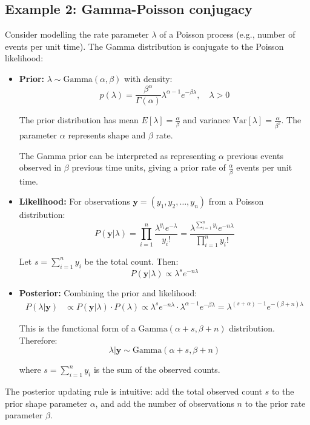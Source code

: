 \subsection{Example 2: Gamma-Poisson conjugacy}
\begin{examplebox}
\begin{example}
Consider modelling the rate parameter $\lambda$ of a Poisson process (e.g., number of events per unit time). The Gamma distribution is conjugate to the Poisson likelihood:
\begin{itemize}
\item \textbf{Prior:} $\lambda \sim \text{Gamma}(\alpha, \beta)$ with density:
$$p(\lambda) = \frac{\beta^\alpha}{\Gamma(\alpha)} \lambda^{\alpha-1} e^{-\beta\lambda}, \quad \lambda > 0$$

The prior distribution has mean $E[\lambda] = \frac{\alpha}{\beta}$ and variance $\text{Var}[\lambda] = \frac{\alpha}{\beta^2}$. The parameter $\alpha$ represents shape and $\beta$ rate.

The Gamma prior can be interpreted as representing $\alpha$ previous events observed in $\beta$ previous time units, giving a prior rate of $\frac{\alpha}{\beta}$ events per unit time.

\item \textbf{Likelihood:} For observations $\mathbf{y} = (y_1, y_2, \dots, y_n)$ from a Poisson distribution:
$$P(\mathbf{y}|\lambda) = \prod_{i=1}^n \frac{\lambda^{y_i} e^{-\lambda}}{y_i!} = \frac{\lambda^{\sum_{i=1}^n y_i} e^{-n\lambda}}{\prod_{i=1}^n y_i!}$$

Let $s = \sum_{i=1}^n y_i$ be the total count. Then:
$$P(\mathbf{y}|\lambda) \propto \lambda^s e^{-n\lambda}$$

\item \textbf{Posterior:} Combining the prior and likelihood:
\begin{align*}
P(\lambda|\mathbf{y}) &\propto P(\mathbf{y}|\lambda) \cdot P(\lambda) \propto \lambda^s e^{-n\lambda} \cdot \lambda^{\alpha-1} e^{-\beta\lambda} = \lambda^{(s+\alpha)-1} e^{-(\beta+n)\lambda}
\end{align*}

This is the functional form of a $\text{Gamma}(\alpha + s, \beta + n)$ distribution. Therefore:
$$\lambda|\mathbf{y} \sim \text{Gamma}(\alpha + s, \beta + n)$$

where $s = \sum_{i=1}^n y_i$ is the sum of the observed counts.
\end{itemize}

The posterior updating rule is intuitive: add the total observed count $s$ to the prior shape parameter $\alpha$, and add the number of observations $n$ to the prior rate parameter $\beta$.


\end{example}
\end{examplebox}
